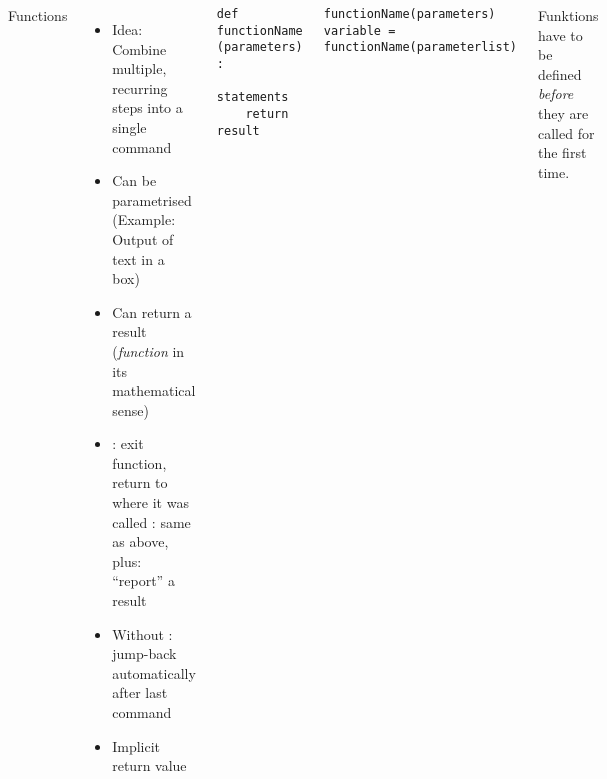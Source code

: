 \begin{frame}[fragile]
%
\begin{columns}[T]
\begin{Large}
{Functions}
\vspace{6pt}
\end{Large}
\begin{itemize}
\item Idea: Combine multiple, recurring steps into a single command
\item Can be parametrised (Example: Output of text in a box)
\item Can return a result (\Thus \emph{function} in its mathematical sense)
\item {}: exit function, return to where it was called
: same as above, plus: \enquote{report} a result
\item Without : jump-back automatically after last command
\item Implicit return value 
\end{itemize}
%
\begin{codebox}
\begin{verbatim}
def functionName (parameters) :
    statements
    return result
\end{verbatim}
\end{codebox}
%
\begin{codebox}
\begin{verbatim}
functionName(parameters)
variable = functionName(parameterlist)
\end{verbatim}
\end{codebox}
%
\begin{hintbox}
Funktions have to be defined \emph{before} they are called for the first time.
\end{hintbox}
\end{columns}
%
\end{frame}


